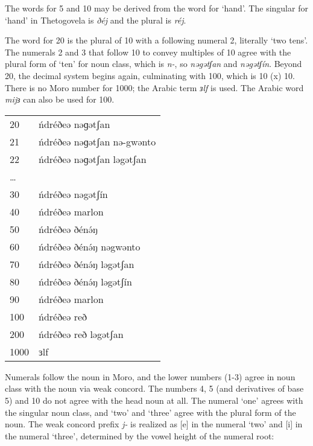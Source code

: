 The words for 5 and 10 may be derived from the word for ‘hand’. The singular for ‘hand’ in Thetogovela is \textit{ðéj} and the plural is \textit{réj}.

The word for 20 is the plural of 10 with a following numeral 2, literally `two tens'. The numerals 2 and 3 that follow 10 to convey multiples of 10 agree with the plural form of `ten' for noun class, which is \textit{n-}, so \textit{nəgətʃan} and \textit{nəgətʃín}. Beyond 20, the decimal system begins again, culminating with 100, which is 10 (x) 10. There is no Moro number for 1000; the Arabic term \textit{ɜlf} is used. The Arabic word \textit{mijɜ} can also be used for 100. 

\ea \begin{tabular}[t]{ll}
20	&ńdréðeə nəɡətʃan                  \\
21	&ńdréðeə nəɡətʃan nə-gwənto \\
22	& ńdréðeə nəɡətʃan ləgətʃan\\
{\ldots} & \\
30	&ńdréðeə nəgətʃín \\
40	&ńdréðeə marlon \\
50	&ńdréðeə ðénə́ŋ \\
60	&ńdréðeə ðénə́ŋ nəgwənto  \\
70	&ńdréðeə ðénə́ŋ ləgətʃan \\
80	&ńdréðeə ðénə́ŋ ləgətʃín  \\
90	&ńdréðeə marlon \\
100	&ńdréðeə reð   \\
200	&ńdréðeə reð ləgətʃan   \\
1000 & 	ɜlf \\
    \end{tabular}
\z

Numerals follow the noun in Moro, and the lower numbers (1-3) agree in noun class with the noun via weak concord. The numbers 4, 5 (and derivatives of base 5) and 10 do not agree with the head noun at all. The numeral ‘one’ agrees with the singular noun class, and ‘two’ and ‘three’ agree with the plural form of the noun. The weak concord prefix \textit{j-} is realized as [e] in the numeral ‘two’ and [i] in the numeral ‘three’, determined by the vowel height of the numeral root: 

